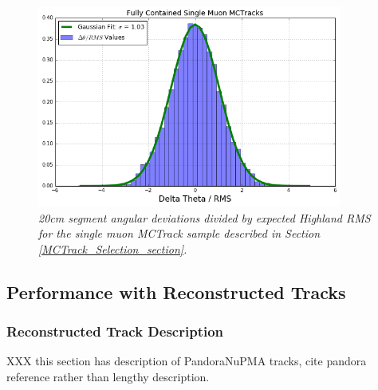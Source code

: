 \begin{figure}[h!]
\begin{center}
\includegraphics[width=100mm]{Figures/Highland_validation_MCTracks.png}
\end{center}
\caption{\textit{20cm segment angular deviations divided by expected Highland RMS for the single muon {\sc MCTrack} sample described in Section \ref{MCTrack_Selection_section}.}}
\label{Highland_validation_MCTracks_fig}
\end{figure}














\subsection{Performance with Reconstructed Tracks}
\subsubsection{Reconstructed Track Description}\label{RecoTrack_section}
XXX this section has description of PandoraNuPMA tracks, cite pandora reference rather than lengthy description.

